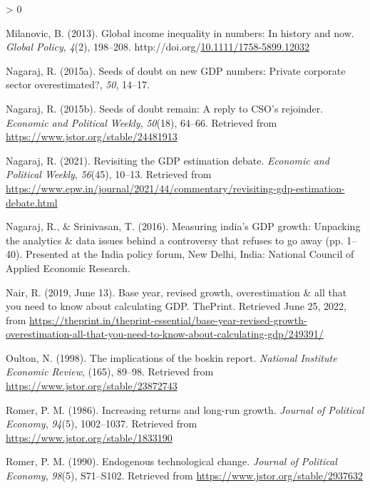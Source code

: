 \documentclass[12pt,nobind, a4paper]{reedthesis}
\newlength{\cslhangindent}
\newenvironment{CSLReferences}[2] %
{%
	\setlength{\parindent}{0pt}
	\ifodd #1 \everypar{\setlength{\hangindent}{\cslhangindent}}\ignorespaces\fi
	\ifnum #2 > 0
	\setlength{\parskip}{#2\baselineskip}
	\fi
}%
{}
\begin{document}
\begin{CSLReferences}{1}{0}
 \leavevmode\hypertarget{ref-milanovic_global_2013}{}%
 Milanovic, B. (2013). Global income inequality in numbers: In history and now. \emph{Global Policy}, \emph{4}(2), 198--208. http://doi.org/\href{https://doi.org/10.1111/1758-5899.12032}{10.1111/1758-5899.12032}

 \leavevmode\hypertarget{ref-nagaraj_seeds_2015-1}{}%
 Nagaraj, R. (2015a). Seeds of doubt on new {GDP} numbers: Private corporate sector overestimated?, \emph{50}, 14--17.

 \leavevmode\hypertarget{ref-nagaraj_seeds_2015}{}%
 Nagaraj, R. (2015b). Seeds of doubt remain: A reply to {CSO}'s rejoinder. \emph{Economic and Political Weekly}, \emph{50}(18), 64--66. Retrieved from \url{https://www.jstor.org/stable/24481913}

 \leavevmode\hypertarget{ref-nagaraj_revisiting_2021}{}%
 Nagaraj, R. (2021). Revisiting the {GDP} estimation debate. \emph{Economic and Political Weekly}, \emph{56}(45), 10--13. Retrieved from \url{https://www.epw.in/journal/2021/44/commentary/revisiting-gdp-estimation-debate.html}

 \leavevmode\hypertarget{ref-nagaraj_measuring_2016}{}%
 Nagaraj, R., \& Srinivasan, T. (2016). Measuring india's {GDP} growth: Unpacking the analytics \& data issues behind a controversy that refuses to go away (pp. 1--40). Presented at the India policy forum, New Delhi, India: National Council of Applied Economic Research.

 \leavevmode\hypertarget{ref-nair_base_2019}{}%
 Nair, R. (2019, June 13). Base year, revised growth, overestimation \& all that you need to know about calculating {GDP}. {ThePrint}. Retrieved June 25, 2022, from \url{https://theprint.in/theprint-essential/base-year-revised-growth-overestimation-all-that-you-need-to-know-about-calculating-gdp/249391/}

 \leavevmode\hypertarget{ref-oulton_implications_1998}{}%
 Oulton, N. (1998). The implications of the boskin report. \emph{National Institute Economic Review}, (165), 89--98. Retrieved from \url{https://www.jstor.org/stable/23872743}

 \leavevmode\hypertarget{ref-romer_increasing_1986}{}%
 Romer, P. M. (1986). Increasing returns and long-run growth. \emph{Journal of Political Economy}, \emph{94}(5), 1002--1037. Retrieved from \url{https://www.jstor.org/stable/1833190}

 \leavevmode\hypertarget{ref-romer_endogenous_1990}{}%
 Romer, P. M. (1990). Endogenous technological change. \emph{Journal of Political Economy}, \emph{98}(5), S71--S102. Retrieved from \url{https://www.jstor.org/stable/2937632}


\end{CSLReferences}
\end{document}

